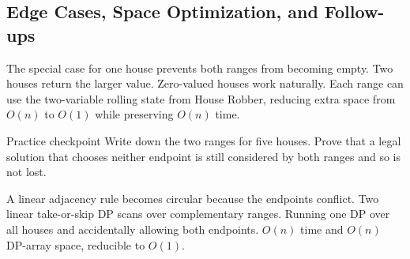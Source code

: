 \subsection{Edge Cases, Space Optimization, and Follow-ups}
The special case for one house prevents both ranges from becoming empty. Two
houses return the larger value. Zero-valued houses work naturally. Each range
can use the two-variable rolling state from House Robber, reducing extra
space from \(O(n)\) to \(O(1)\) while preserving \(O(n)\) time.

\begin{revisionbox}{Practice checkpoint}
Write down the two ranges for five houses. Prove that a legal solution that
chooses neither endpoint is still considered by both ranges and so is
not lost.
\end{revisionbox}
\chaptercheckpoint
  {A linear adjacency rule becomes circular because the endpoints conflict.}
  {Two linear take-or-skip DP scans over complementary ranges.}
  {Running one DP over all houses and accidentally allowing both endpoints.}
  {$O(n)$ time and $O(n)$ DP-array space, reducible to $O(1)$.}
\judgeclassnote